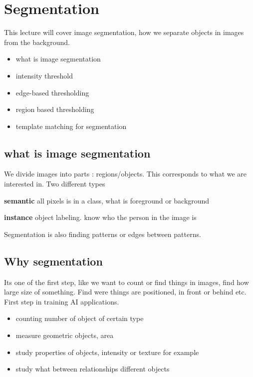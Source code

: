 


\section{Segmentation}
This lecture will cover image segmentation, how we separate objects in images from the background. 


\begin{itemize}
	\item what is image segmentation
	\item intensity threshold
	\item edge-based thresholding
	\item region based thresholding
	\item template matching for segmentation
\end{itemize}

\subsection*{what is image segmentation}
We divide images into parts : regions/objects. This corresponds to what we are interested in. Two different types

\textbf{semantic} all pixels is in a class, what is foreground or background

\textbf{instance} object labeling. know who the person in the image is

Segmentation is also finding patterns or edges between patterns. 

\subsection*{Why segmentation}
Its one of the first step, like we want to count or find things in images, find how large size of something. Find were things are positioned, in front or behind etc. First step in training AI applications.

\begin{itemize}
	\item counting number of object of certain type
	\item measure geometric objects, area 
	\item study properties of objects, intensity or texture for example
	\item study what between relationships  different objects
\end{itemize}

